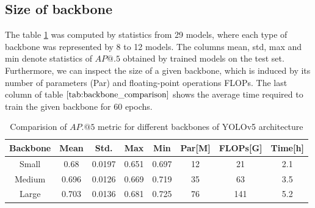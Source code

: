 \subsection{Size of backbone}
The table \ref{tab:backbone_comparison} was computed by statistics from 29 models, where each type of backbone was represented by 8 to 12 models. The columns mean, std, max and min denote statistics of $AP@.5$ obtained by trained models on the test set. Furthermore, we can inspect the size of a given backbone, which is induced by its number of parameters (Par) and floating-point operations FLOPs. The last column of table $\ref{tab:backbone_comparison}$ shows the average time required to train the given backbone for $60$ epochs.
\begin{table}[H]
    \begin{tabular}{|c|c|c|c|c|c|c|c|}
        \hline
        Backbone & Mean  & Std.   & Max   & Min   & Par[M] & FLOPs[G] & Time[h] \\ \hline
        Small    & 0.68  & 0.0197 & 0.651 & 0.697 & 12     & 21       & 2.1     \\ \hline
        Medium   & 0.696 & 0.0126 & 0.669 & 0.719 & 35     & 63       & 3.5     \\ \hline
        Large    & 0.703 & 0.0136 & 0.681 & 0.725 & 76     & 141      & 5.2     \\ \hline
    \end{tabular}
    \caption{Comparision of $AP.@5$ metric for different backbones of YOLOv5 architecture}
    \label{tab:backbone_comparison}
\end{table}

